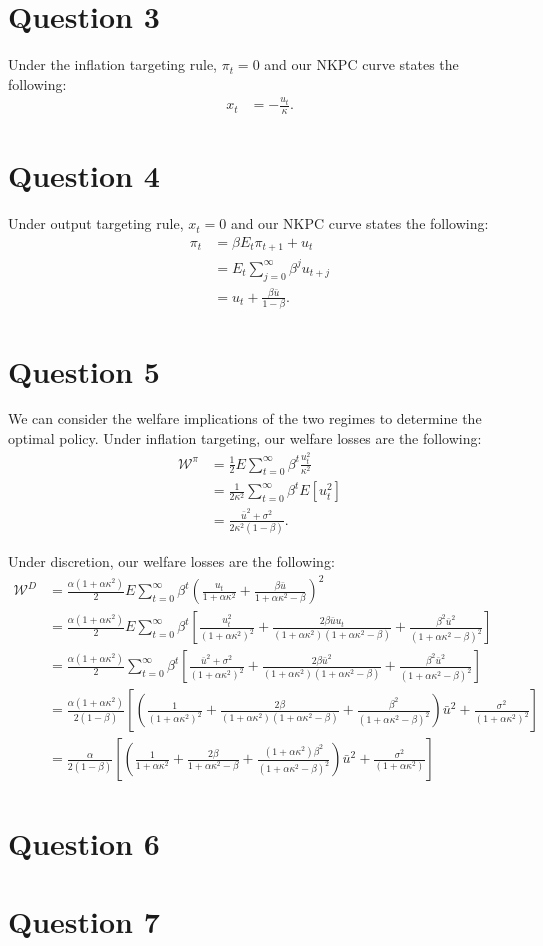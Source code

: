 \documentclass[11pt]{article} %
\begin{document}
\section{Question 3}
Under the inflation targeting rule, $\pi_t = 0$ and our NKPC curve states the following:
\begin{align*}
x_t &= -\frac{u_t}{\kappa}.
\end{align*}
\section{Question 4}
Under output targeting rule, $x_t = 0$ and our NKPC curve states the following:
\begin{align*}
\pi_t &= \beta E_t\pi_{t+1} + u_t\\
&=  E_t\sum_{j=0}^{\infty}\beta^{j}u_{t+j}\\
&= u_t + \frac{\beta\bar{u}}{1-\beta}.
\end{align*}

\section{Question 5}
We can consider the welfare implications of the two regimes to determine the optimal policy. Under inflation targeting, our welfare losses are the following:
\begin{align*}
\mathcal{W}^{\pi} &= \frac{1}{2}E\sum_{t=0}^{\infty}\beta^t \frac{u_t^2}{\kappa^2}\\
&= \frac{1}{2\kappa^2}\sum_{t=0}^{\infty}\beta^t E[u_t^2]\\
&= \frac{\bar{u}^2 + \sigma^2}{2\kappa^2(1-\beta)}.
\end{align*}

Under discretion, our welfare losses are the following:
\begin{align*}
\mathcal{W}^{D} &= \frac{\alpha(1+\alpha\kappa^2)}{2}E\sum_{t=0}^{\infty}\beta^t \left(  \frac{u_t}{1+\alpha\kappa^2} + \frac{\beta\bar{u}}{1+\alpha\kappa^2 - \beta}\right)^2\\
&=  \frac{\alpha(1+\alpha\kappa^2)}{2} E\sum_{t=0}^{\infty}\beta^t \left[ \frac{u_t^2}{(1+\alpha \kappa^2)^2} + \frac{2\beta\bar{u}u_t}{(1+\alpha\kappa^2)(1+\alpha\kappa^2 - \beta)} + \frac{\beta^2\bar{u}^2}{(1+\alpha\kappa^2 - \beta)^2} \right] \\
&=  \frac{\alpha(1+\alpha\kappa^2)}{2} \sum_{t=0}^{\infty}\beta^t \left[ \frac{\bar{u}^2 + \sigma^2}{(1+\alpha \kappa^2)^2} + \frac{2\beta\bar{u}^2}{(1+\alpha\kappa^2)(1+\alpha\kappa^2 - \beta)} + \frac{\beta^2\bar{u}^2}{(1+\alpha\kappa^2 - \beta)^2} \right] \\
&=  \frac{\alpha(1+\alpha\kappa^2)}{2(1-\beta)} \left[\left( \frac{1}{(1+\alpha\kappa^2)^2} + \frac{2\beta}{(1+\alpha\kappa^2)(1+\alpha\kappa^2 - \beta)}  +  \frac{\beta^2}{(1+\alpha\kappa^2 - \beta)^2} \right)\bar{u}^2 + \frac{\sigma^2}{(1+\alpha\kappa^2)^2} \right] \\
&=  \frac{\alpha}{2(1-\beta)} \left[\left( \frac{1}{1+\alpha\kappa^2} + \frac{2\beta}{1+\alpha\kappa^2 - \beta}  +  \frac{(1+\alpha \kappa^2)\beta^2}{(1+\alpha\kappa^2 - \beta)^2} \right)\bar{u}^2 + \frac{\sigma^2}{(1+\alpha\kappa^2)} \right]
\end{align*}
\section{Question 6}
\section{Question 7}
\end{document}
